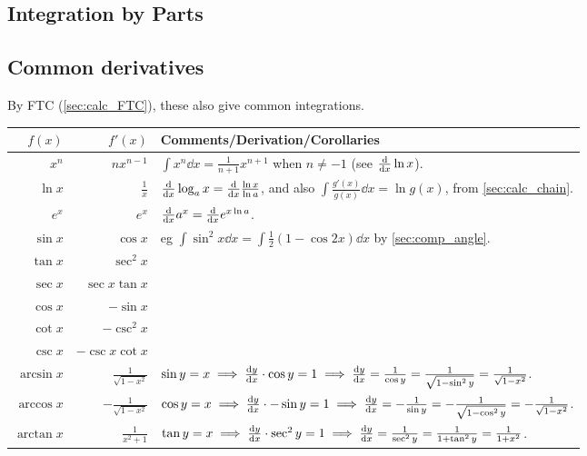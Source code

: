 \documentclass[a4paper,11pt]{article}
\begin{document}
    \subsection{Integration by Parts}

    \subsection{Common derivatives} \label{calc:common}


    By FTC (\ref{sec:calc_FTC}), these also give common integrations.

    \begin{longtable}{rrl}
    \toprule
    \boldmath$f(x)$ & \boldmath$f'(x)$ &
    \bfseries Comments/Derivation/Corollaries \\
    \midrule
    \endhead
    $x^n$ & $nx^{n-1}$
        & $\int x^n \dd{x} = \frac{1}{n + 1}x^{n + 1}$ when
          $n \neq -1$ (see $\dv{}{x}\ln x$).\\
    $\ln x$ & $\frac{1}{x}$
        & $\dv{}{x}\log_a x = \dv{}{x} \frac{\ln x}{\ln a}$, and also
          $\int \frac{g'(x)}{g(x)} \dd{x} = \ln g(x)$,
            from \ref{sec:calc_chain}.\\
    $e^x$ & $e^x$ & $\dv{}{x}a^x = \dv{}{x}e^{x \ln a}$. \\
    $\sin x$ & $\cos x$
        & eg $\int \sin^2 x \dd{x} = \int \frac 12 (1 - \cos 2x) \dd{x}$
          by \ref{sec:comp_angle}. \\
    $\tan x$ & $\sec^2 x$ \\
    $\sec x$ & $\sec x \tan x$ \\
    $\cos x$ & $-\sin x$ \\
    $\cot x$ & $-\csc^2 x$ \\
    $\csc x$ & $-\csc x \cot x$ \\
    $\arcsin x$ & $\frac{1}{\sqrt{1 - x^2}}$
        & $\sin y = x \implies \dv{y}{x} \cdot \cos y = 1 \implies
           \dv{y}{x} = \frac{1}{\cos y}
         = \frac{1}{\sqrt{1 - \sin^2 y}} = \frac{1}{\sqrt{1 - x^2}}$. \\
    $\arccos x$ & $-\frac{1}{\sqrt{1 - x^2}}$
        & $\cos y = x \implies \dv{y}{x} \cdot -\sin y = 1 \implies
           \dv{y}{x} = -\frac{1}{\sin y}
         = -\frac{1}{\sqrt{1 - \cos^2 y}} = -\frac{1}{\sqrt{1 - x^2}}$. \\
    $\arctan x$ & $\frac{1}{x^2 + 1}$
        & $\tan y = x \implies \dv{y}{x} \cdot \sec^2 y = 1 \implies
           \dv{y}{x} = \frac{1}{\sec^2 y} = \frac{1}{1 + \tan^2 y}
         = \frac{1}{1 + x^2}$. \\
    \bottomrule
    \end{longtable}
\end{document}
